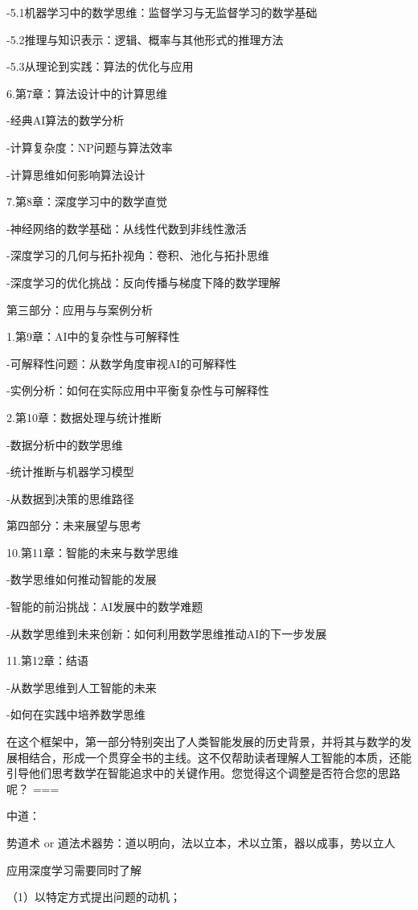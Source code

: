 -5.1机器学习中的数学思维：监督学习与无监督学习的数学基础

-5.2推理与知识表示：逻辑、概率与其他形式的推理方法

-5.3从理论到实践：算法的优化与应用

6.第7章：算法设计中的计算思维

-经典AI算法的数学分析

-计算复杂度：NP问题与算法效率

-计算思维如何影响算法设计

7.第8章：深度学习中的数学直觉

-神经网络的数学基础：从线性代数到非线性激活

-深度学习的几何与拓扑视角：卷积、池化与拓扑思维

-深度学习的优化挑战：反向传播与梯度下降的数学理解

    第三部分：应用与与案例分析

1.第9章：AI中的复杂性与可解释性

-可解释性问题：从数学角度审视AI的可解释性

-实例分析：如何在实际应用中平衡复杂性与可解释性

2.第10章：数据处理与统计推断

-数据分析中的数学思维

-统计推断与机器学习模型

-从数据到决策的思维路径

    第四部分：未来展望与思考
    
10.第11章：智能的未来与数学思维

-数学思维如何推动智能的发展

-智能的前沿挑战：AI发展中的数学难题

-从数学思维到未来创新：如何利用数学思维推动AI的下一步发展

11.第12章：结语

-从数学思维到人工智能的未来

-如何在实践中培养数学思维




在这个框架中，第一部分特别突出了人类智能发展的历史背景，并将其与数学的发展相结合，形成一个贯穿全书的主线。这不仅帮助读者理解人工智能的本质，还能引导他们思考数学在智能追求中的关键作用。您觉得这个调整是否符合您的思路呢？
===

中道：

势道术 or 道法术器势：道以明向，法以立本，术以立策，器以成事，势以立人


应用深度学习需要同时了解

（1）以特定方式提出问题的动机；

